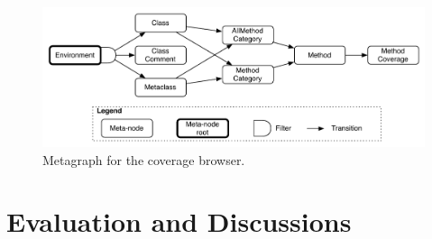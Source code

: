 \documentclass[a4paper,10pt,twoside]{book}
\begin{document}
\begin{figure}[!ht]
\begin{center}
\includegraphics[scale=0.45]{cb-graph.pdf}
\caption{Metagraph for the coverage browser.} 
\end{center}
\end{figure}






\section{Evaluation and Discussions} 
\end{document}
